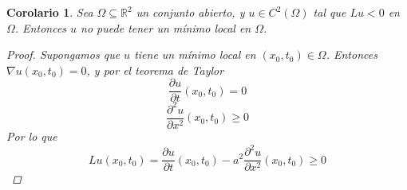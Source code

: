 \documentclass[11pt]{book}
\theoremstyle{plain}
\newtheorem{coro}[proposición]{Corolario}
\theoremstyle{definition}
\newcommand{\R}{\mathbb{R}}
\begin{document}
\begin{coro}
    Sea $\Omega \subseteq \R^{2}$ un conjunto abierto, y $u \in C^{2}(\Omega)$ tal que $Lu < 0$ en $\Omega$. Entonces $u$ no puede tener un mínimo local en $\Omega$.
    \begin{proof}
        Supongamos que $u$ tiene un mínimo local en $(x_{0},t_{0}) \in \Omega$. Entonces $\nabla u(x_{0},t_{0}) = 0$, y por el teorema de Taylor
        \[
            \frac{\partial u}{\partial t}(x_{0},t_{0}) = 0
        \]
        \[
            \frac{\partial^2 u}{\partial x^2}(x_{0},t_{0}) \geq 0
        \]
        Por lo que
        \[
            Lu(x_{0},t_{0}) = \frac{\partial u}{\partial t}(x_{0},t_{0}) - a^{2} \frac{\partial^2 u}{\partial x^2}(x_{0},t_{0}) \geq 0
        \]
    \end{proof}
\end{coro}
\end{document}
